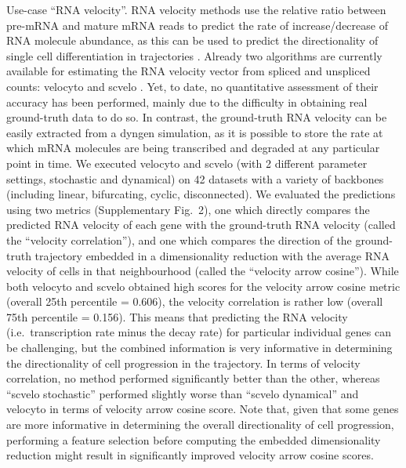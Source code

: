 \documentclass[10pt, a4paper]{article}
\begin{document}
Use-case ``RNA velocity''. RNA velocity methods use the relative ratio
between pre-mRNA and mature mRNA reads to predict the rate of
increase/decrease of RNA molecule abundance, as this can be used to
predict the directionality of single cell differentiation in
trajectories
\cite{zeisel_coupledpremrnamrna_2011,lamanno_rnavelocitysingle_2018}.
Already two algorithms are currently available for estimating the RNA
velocity vector from spliced and unspliced counts: velocyto
\cite{lamanno_rnavelocitysingle_2018} and scvelo
\cite{bergen_generalizingrnavelocity_2020}. Yet, to date, no
quantitative assessment of their accuracy has been performed, mainly due
to the difficulty in obtaining real ground-truth data to do so. In
contrast, the ground-truth RNA velocity can be easily extracted from a
dyngen simulation, as it is possible to store the rate at which mRNA
molecules are being transcribed and degraded at any particular point in
time. We executed velocyto and scvelo (with 2 different parameter
settings, stochastic and dynamical) on 42 datasets with a variety of
backbones (including linear, bifurcating, cyclic, disconnected). We
evaluated the predictions using two metrics (Supplementary Fig.~2), one
which directly compares the predicted RNA velocity of each gene with the
ground-truth RNA velocity (called the ``velocity correlation''), and one
which compares the direction of the ground-truth trajectory embedded in
a dimensionality reduction with the average RNA velocity of cells in
that neighbourhood (called the ``velocity arrow cosine''). While both
velocyto and scvelo obtained high scores for the velocity arrow cosine
metric (overall 25th percentile = 0.606), the velocity correlation is
rather low (overall 75th percentile = 0.156). This means that predicting
the RNA velocity (i.e.~transcription rate minus the decay rate) for
particular individual genes can be challenging, but the combined
information is very informative in determining the directionality of
cell progression in the trajectory. In terms of velocity correlation, no
method performed significantly better than the other, whereas ``scvelo
stochastic'' performed slightly worse than ``scvelo dynamical'' and
velocyto in terms of velocity arrow cosine score. Note that, given that
some genes are more informative in determining the overall
directionality of cell progression, performing a feature selection
before computing the embedded dimensionality reduction might result in
significantly improved velocity arrow cosine scores.
\end{document}
